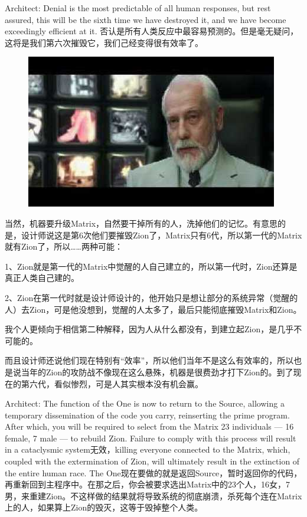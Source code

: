 \documentclass[UTF8]{ctexart}
\begin{document}
Architect: Denial is the most predictable of all human responses, but rest assured, this will be the sixth time we have destroyed it, and we have become exceedingly efficient at it. 否认是所有人类反应中最容易预测的。但是毫无疑问，这将是我们第六次摧毁它，我们己经变得很有效率了。

\begin{figure}[htb]
\centering
\includegraphics[width=0.5\linewidth]{fig/read_reloaded-164}
\end{figure}

当然，机器要升级Matrix，自然要干掉所有的人，洗掉他们的记忆。有意思的是，设计师说这是第6次他们要摧毁Zion了，Matrix只有6代，所以第一代的Matrix就有Zion了，所以……两种可能：

1、Zion就是第一代的Matrix中觉醒的人自己建立的，所以第一代时，Zion还算是真正人类自己建的。

2、Zion在第一代时就是设计师设计的，他开始只是想让部分的系统异常（觉醒的人）去Zion，可是他没想到，觉醒的人太多了，最后只能彻底摧毁Matrix和Zion。

我个人更倾向于相信第二种解释，因为人从什么都没有，到建立起Zion，是几乎不可能的。

而且设计师还说他们现在特别有“效率”，所以他们当年不是这么有效率的，所以也是说当年的Zion的攻防战不像现在这么悬殊，机器是很费劲才打下Zion的。到了现在的第六代，看似惨烈，可是人其实根本没有机会赢。

Architect: The function of the One is now to return to the Source, allowing a temporary dissemination of the code you carry, reinserting the prime program. After which, you will be required to select from the Matrix 23 individuals --- 16 female, 7 male --- to rebuild Zion. Failure to comply with this process will result in a cataclysmic system无效，killing everyone connected to the Matrix, which, coupled with the extermination of Zion, will ultimately result in the extinction of the entire human race. The One现在要做的就是返回Source，暂时返回你的代码，再重新回到主程序中。在那之后，你会被要求选出Matrix中的23个人，16女，7男，来重建Zion。不这样做的结果就将导致系统的彻底崩溃，杀死每个连在Matrix上的人，如果算上Zion的毁灭，这等于毁掉整个人类。
\end{document}
